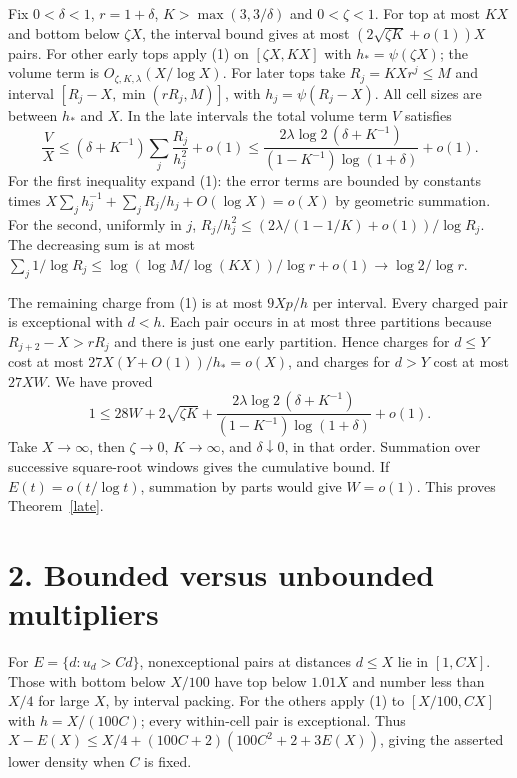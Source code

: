 \documentclass[10pt,a4paper]{article}
\begin{document}
Fix $0<\delta<1$, $r=1+\delta$, $K>\max(3,3/\delta)$ and $0<\zeta<1$. For top at most $KX$ and bottom below $\zeta X$, the interval bound gives at most $(2\sqrt{\zeta K}+o(1))X$ pairs. For other early tops apply (1) on $[\zeta X,KX]$ with $h_*=\psi(\zeta X)$; the volume term is $O_{\zeta,K,\lambda}(X/\log X)$. For later tops take $R_j=KXr^j\le M$ and interval $[R_j-X,\min(rR_j,M)]$, with $h_j=\psi(R_j-X)$. All cell sizes are between $h_*$ and $X$. In the late intervals the total volume term $V$ satisfies
\[
 \frac VX\le (\delta+K^{-1})\sum_j\frac{R_j}{h_j^2}+o(1)
 \le \frac{2\lambda\log2\,(\delta+K^{-1})}
 {(1-K^{-1})\log(1+\delta)}+o(1).
\]
For the first inequality expand (1): the error terms are bounded by constants times $X\sum_jh_j^{-1}+\sum_j R_j/h_j+O(\log X)=o(X)$ by geometric summation. For the second, uniformly in $j$, $R_j/h_j^2\le(2\lambda/(1-1/K)+o(1))/\log R_j$. The decreasing sum is at most $\sum_j1/\log R_j\le \log(\log M/\log(KX))/\log r+o(1)\to\log2/\log r$.

The remaining charge from (1) is at most $9Xp/h$ per interval. Every charged pair is exceptional with $d<h$. Each pair occurs in at most three partitions because $R_{j+2}-X>rR_j$ and there is just one early partition. Hence charges for $d\le Y$ cost at most $27X(Y+O(1))/h_*=o(X)$, and charges for $d>Y$ cost at most $27XW$. We have proved
\[
1\le 28W+2\sqrt{\zeta K}+\frac{2\lambda\log2\,(\delta+K^{-1})}{(1-K^{-1})\log(1+\delta)}+o(1).
\]
Take $X\to\infty$, then $\zeta\to0$, $K\to\infty$, and $\delta\downarrow0$, in that order. Summation over successive square-root windows gives the cumulative bound. If $E(t)=o(t/\log t)$, summation by parts would give $W=o(1)$. This proves Theorem~\ref{late}.

\section*{2. Bounded versus unbounded multipliers}
For $E=\{d:u_d>Cd\}$, nonexceptional pairs at distances $d\le X$ lie in $[1,CX]$. Those with bottom below $X/100$ have top below $1.01X$ and number less than $X/4$ for large $X$, by interval packing. For the others apply (1) to $[X/100,CX]$ with $h=X/(100C)$; every within-cell pair is exceptional. Thus $X-E(X)\le X/4+(100C+2)(100C^2+2+3E(X))$, giving the asserted lower density when $C$ is fixed.
\end{document}
